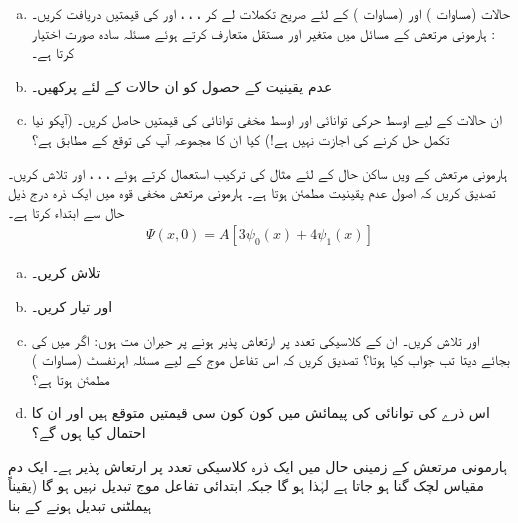 %
\begin{enumerate}[a.]
\item
حالات  (مساوات )   اور  (مساوات ) کے لئے صریح تکملات لے کر  ، ، ، اور  کی قیمتیں  دریافت کریں۔ : ہارمونی مرتعش کے مسائل میں متغیر  اور مستقل 
 متعارف کرتے ہوئے مسئلہ سادہ صورت اختیار کرتا ہے۔
\item
عدم یقینیت  کے حصول کو ان حالات کے لئے پرکھیں۔
\item
ان حالات کے لیے اوسط حرکی توانائی  اور اوسط مخفی توانائی  کی قیمتیں حاصل کریں۔ (آپکو نیا تکمل حل کرنے کی اجازت نہیں ہے!) کیا ان کا مجموعہ آپ کی توقع کے مطابق ہے؟
\end{enumerate}
%
ہارمونی مرتعش کے  ویں ساکن حال کے لئے مثال 
کی ترکیب استعمال کرتے ہوئے ، ، ،   اور  تلاش کریں۔ تصدیق کریں کہ اصول عدم یقینیت مطمئن ہوتا ہے۔
%
ہارمونی مرتعش مخفی قوہ میں ایک ذرہ درج ذیل حال سے ابتداء کرتا ہے۔
\begin{align*}
\Psi(x,0)=A[3\psi_{0}(x)+4\psi_{1}(x)]
\end{align*}
\begin{enumerate}[a.]
\item
{} تلاش کریں۔
\item
{} اور  تیار کریں۔
\item
{} اور  تلاش کریں۔ ان کے کلاسیکی تعدد پر ارتعاش پذیر ہونے پر حیران مت ہوں: اگر میں  کی بجائے  دیتا تب جواب کیا ہوتا؟  تصدیق کریں کہ اس تفاعل موج کے لیے مسئلہ اہرنفسٹ (مساوات )  مطمئن ہوتا ہے؟
\item
اس ذرے کی توانائی کی پیمائش میں کون کون سی قیمتیں متوقع ہیں اور ان کا احتمال کیا ہوں گے؟
\end{enumerate}
%
ہارمونی مرتعش کے زمینی حال میں ایک ذرہ کلاسیکی تعدد  پر ارتعاش پذیر ہے۔ ایک دم مقیاس لچک  گنا ہو جاتا ہے لہٰذا  ہو گا جبکہ ابتدائی تفاعل موج تبدیل نہیں ہو گا (یقیناً ہیملٹنی تبدیل ہونے کے بنا 

